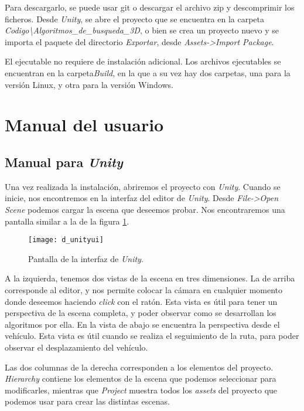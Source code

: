 Para descargarlo, se puede usar git o descargar el archivo zip y descomprimir los ficheros. Desde \textit{Unity}, se abre el proyecto que se encuentra en la carpeta \textit{Codigo\textbackslash Algoritmos\_de\_busqueda\_3D}, o bien se crea un proyecto nuevo y se importa el paquete del directorio \textit{Exportar}, desde \textit{Assets-\textgreater Import Package}.

El ejecutable no requiere de instalación adicional. Los archivos ejecutables se encuentran en la carpeta\textit{Build}, en la que a su vez hay dos carpetas, una para la versión Linux, y otra para la versión Windows.

\section{Manual del usuario}
\subsection{Manual para \textit{Unity}}
Una vez realizada la instalación, abriremos el proyecto con \textit{Unity}. Cuando se inicie, nos encontremos en la interfaz del editor de \textit{Unity}. Desde \textit{File-\textgreater Open Scene} podemos cargar la escena que deseemos probar. Nos encontraremos una pantalla similar a la de la figura \ref{fig:dunityui}.

\begin{figure}[htpb]
    \centering
    \texttt{[image: d\_unityui]}
    \caption[Pantalla de la interfaz de \textit{Unity}]{Pantalla de la interfaz de \textit{Unity}.}
    \label{fig:dunityui}
\end{figure}

A la izquierda, tenemos dos vistas de la escena en tres dimensiones. La de arriba corresponde al editor, y nos permite colocar la cámara en cualquier momento donde deseemos haciendo \textit{click} con el ratón. Esta vista es útil para tener un perspectiva de la escena completa, y poder observar como se desarrollan los algoritmos por ella. En la vista de abajo se encuentra la perspectiva desde el vehículo. Esta vista es útil cuando se realiza el seguimiento de la ruta, para poder observar el desplazamiento del vehículo.

Las dos columnas de la derecha corresponden a los elementos del proyecto. \textit{Hierarchy} contiene los elementos de la escena que podemos seleccionar para modificarles, mientras que \textit{Project} muestra todos los \textit{assets} del proyecto que podemos usar para crear las distintas escenas.

